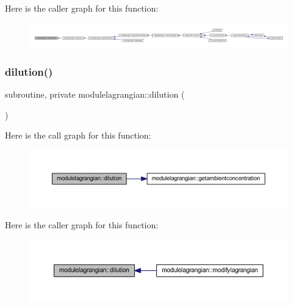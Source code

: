 Here is the caller graph for this function\+:\nopagebreak
\begin{figure}[H]
\begin{center}
\leavevmode
\includegraphics[width=350pt]{namespacemodulelagrangian_abff255f913afc4b6a6e6434a97f541f9_icgraph}
\end{center}
\end{figure}
\mbox{\label{namespacemodulelagrangian_af886fd4c925246d6362ab14b2bfdcff1}} 
\subsubsection{\texorpdfstring{dilution()}{dilution()}}
{\footnotesize\ttfamily subroutine, private modulelagrangian\+::dilution (\begin{DoxyParamCaption}{ }\end{DoxyParamCaption})\hspace{0.3cm}{\ttfamily [private]}}

Here is the call graph for this function\+:\nopagebreak
\begin{figure}[H]
\begin{center}
\leavevmode
\includegraphics[width=350pt]{namespacemodulelagrangian_af886fd4c925246d6362ab14b2bfdcff1_cgraph}
\end{center}
\end{figure}
Here is the caller graph for this function\+:\nopagebreak
\begin{figure}[H]
\begin{center}
\leavevmode
\includegraphics[width=350pt]{namespacemodulelagrangian_af886fd4c925246d6362ab14b2bfdcff1_icgraph}
\end{center}
\end{figure}
\mbox{\label{namespacemodulelagrangian_a979d39b0267ea25c8a2db002477e9ffd}} 
